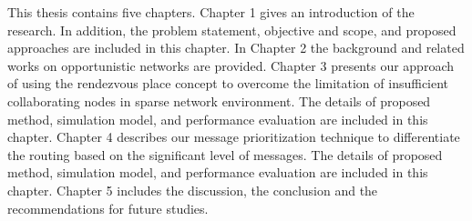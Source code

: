This thesis contains five chapters.
%
Chapter 1 gives an introduction of the research.
%
In addition, the problem statement, objective and scope, and proposed approaches are included in this chapter.
%
In Chapter 2 the background and related works on opportunistic networks are provided.
%
Chapter 3 presents our approach of using the rendezvous place concept to overcome the limitation of insufficient collaborating nodes in sparse network environment.
%
The details of proposed method, simulation model, and performance evaluation are included in this chapter.
%
Chapter 4 describes our message prioritization technique to differentiate the routing based on the significant level of messages.
%
The details of proposed method, simulation model, and performance evaluation are included in this chapter.
%
Chapter 5 includes the discussion, the conclusion and the recommendations for future studies.